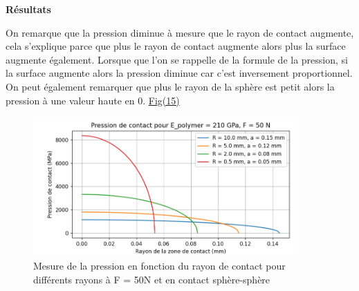 \documentclass[a4paper,12pt]{article}
\begin{document}
\begin{center}
	\textbf{Résultats}
\end{center}
On remarque que la pression diminue à mesure que le rayon de contact augmente, cela s'explique parce que plus le rayon de contact augmente alors plus la surface augmente également. Lorsque que l'on se rappelle de la formule de la pression, si la surface augmente alors la pression diminue car c'est inversement proportionnel.\\
On peut également remarquer que plus le rayon de la sphère est petit alors la pression à une valeur haute en 0. \hyperref[fig:mon_image15]{Fig(15)}
\begin{figure}[H] 
	\centering
	\includegraphics[width=0.9\textwidth]{pre.png} 
	\caption{Mesure de la pression en fonction du rayon de contact pour différents rayons à F = 50N et en contact sphère-sphère} 
	\label{fig:mon_image15} 
\end{figure}
\end{document}

